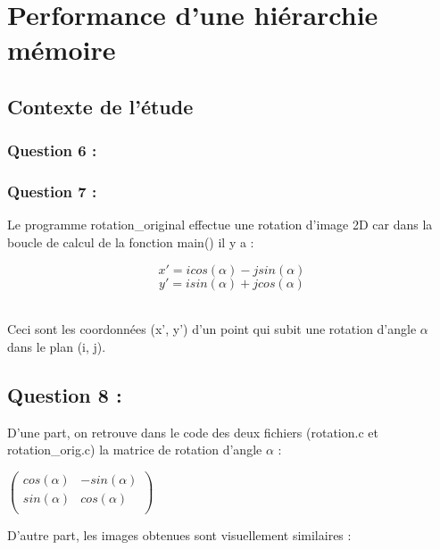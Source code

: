 \documentclass[11pt,a4paper]{article}
\def\alp{\ensuremath{\alpha} }
\begin{document}
\section{Performance d’une hiérarchie mémoire}
    \subsection{Contexte de l’étude}
        \subsubsection{Question 6 :}
        
        \subsubsection{Question 7 :}
        
Le programme rotation\_original effectue une rotation d’image 2D car dans la
boucle de calcul de la fonction main() il y a :
\begin{center}
    \[x' = icos(\alpha ) - jsin(\alpha )\]
    \[y' = isin(\alpha ) + jcos(\alpha )\]
\end{center}
~\\
{Ceci sont les coordonnées (x', y') d'un point qui subit une rotation d'angle
\alp dans le plan (i, j).}

\subsection{Question 8 :}
D'une part, on retrouve dans le code des deux fichiers (rotation.c et
rotation\_orig.c) la matrice de rotation d'angle \alp :
\begin{center}
$
\begin{pmatrix}
   cos(\alp) & -sin(\alp) \\
   sin(\alp) & cos(\alp)\\
\end{pmatrix}
$
\end{center}
D'autre part, les images obtenues sont visuellement similaires :
\end{document}
